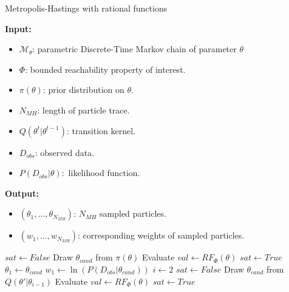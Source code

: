 \begin{algorithm}[H]
      \caption{Metropolis-Hastings with rational functions}
      \label{alg:rf-mcmc}
      \footnotesize{
            \hspace*{\algorithmicindent} \textbf{Input:}
            \begin{itemize}
                  \item $\mathcal{M}_\theta$: parametric Discrete-Time Markov chain of parameter $\theta$
                  \item $\Phi$: bounded reachability property of interest.
                  \item $\pi(\theta)$: prior distribution on $\theta$.
                  \item $N_{MH}$: length of particle trace.
                  \item $Q(\theta^t|\theta^{t-1})$: transition kernel.
                  \item $D_{obs}$: observed data.
                  \item $P(D_{obs}|\theta):$ likelihood function.
            \end{itemize}
            \hspace*{\algorithmicindent} \textbf{Output:}
            \begin{itemize}
                  \item $(\theta_1,\ldots,\theta_{N_{MH}})$: $N_{MH}$ sampled particles.
                  \item $(w_1,\ldots,w_{N_{MH}})$: corresponding weights of sampled particles.
            \end{itemize}
      }
      \begin{algorithmic}[1]
            \State $sat \leftarrow False$
            \State Draw $\theta_{cand}$ from $\pi(\theta)$
            \State Evaluate $val \leftarrow RF_{\Phi}(\theta)$
            \State $sat \leftarrow True$
            \EndIf
            \EndWhile
            \State $\theta_1 \leftarrow  \theta_{cand}$
            \State $w_1 \leftarrow  \ln(P(D_{obs}|\theta_{cand}))$
            \State $i \leftarrow 2$
            \State $sat \leftarrow False $
            \State Draw $\theta_{cand}$ from $Q(\theta'|\theta_{i-1})$
            \State Evaluate $val \leftarrow RF_{\Phi}(\theta)$
            \State $sat \leftarrow True$

\end{algorithmic}
\end{algorithm}
